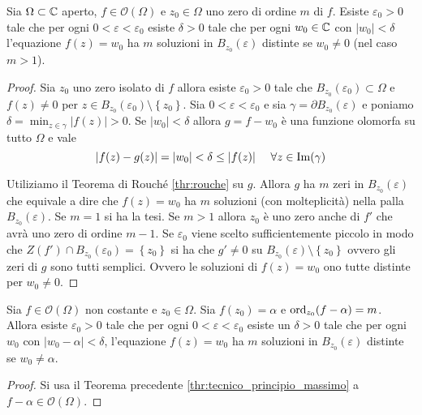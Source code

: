 \begin{theorem}
	\label{thr:tecnico_principio_massimo}
  Sia $\Omega \subset \mathbb{C}$ aperto, $f \in \mathcal{O}(\Omega)$ e $z_0 \in \Omega$
  uno zero di ordine $m$ di $f$. Esiste $\varepsilon_0 > 0$ tale che per ogni $0
  < \varepsilon < \varepsilon_0$ esiste $\delta > 0$ tale che per ogni $w_0 \in
  \mathbb{C}$ con $|w_0| < \delta$ l'equazione $f(z) = w_0$ ha $m$ soluzioni in
  $B_{z_0}(\varepsilon)$ distinte se $w_0 \neq 0$ (nel caso $m > 1$). 
\end{theorem}
\begin{proof}
    Sia $z_0$ uno zero isolato di $f$ allora esiste $\varepsilon_0 > 0$ tale che
    $B_{z_0}(\varepsilon_0) \subset \Omega$ e $f(z) \neq 0$ per $z \in
    B_{z_0}(\varepsilon_0) \setminus \left\{ z_0 \right\}$. Sia $0 < \varepsilon
    < \varepsilon_0$ e sia $\gamma = \partial B_{z_0}(\varepsilon)$ e poniamo 
    $\delta = \min_{z \in \gamma} |f(z)| > 0$. Se $|w_0| < \delta$ allora $g
    = f - w_0$ è una funzione olomorfa su tutto $\Omega$ e vale 
    \begin{equation*}
      |f(z) - g(z)| = |w_0| < \delta \le |f(z)| \quad\ \forall z \in
      \operatorname{Im}(\gamma)
    \end{equation*}
    
    Utiliziamo il Teorema di Rouché \ref{thr:rouche} su $g$. Allora $g$ ha $m$
    zeri in $B_{z_0}(\varepsilon)$ che equivale a dire che $f(z) = w_0$ ha $m$
    soluzioni (con molteplicità) nella palla $B_{z_0}(\varepsilon)$.
    Se $m = 1$ si ha la tesi.
    Se $m > 1$ allora $z_0$ è uno zero anche di $f'$ che avrà uno zero di ordine
    $m-1$. Se $\varepsilon_0$ viene scelto sufficientemente piccolo in modo che
    $Z(f') \cap B_{z_0}(\varepsilon_0) = \left\{ z_0 \right\}$ si ha che $g'
    \neq 0$ su $B_{z_0}(\varepsilon) \setminus \left\{ z_0 \right\}$ ovvero gli
    zeri di $g$ sono tutti semplici. Ovvero le soluzioni di $f(z) = w_0$ ono
    tutte distinte per $w_0 \neq 0$.
\end{proof}

\begin{corollary}
	\label{cor:tecnico_principio_massimo}
  Sia $f \in \mathcal{O}(\Omega)$ non costante e $z_0 \in \Omega$. Sia $f(z_0)
  = \alpha$ e $\operatorname{ord}_{z_0}(f-\alpha) = m$. Allora esiste $\varepsilon_0 > 0$ tale
  che per ogni $0 < \varepsilon < \varepsilon_0$ esiste un $\delta > 0$ tale che
  per ogni $w_0$ con $|w_0 - \alpha| < \delta$, l'equazione $f(z) = w_0$ ha $m$
  soluzioni in $B_{z_0}(\varepsilon)$ distinte se $w_0 \neq \alpha$.
\end{corollary}
\begin{proof}
  Si usa il Teorema precedente \ref{thr:tecnico_principio_massimo} a $f - \alpha
  \in \mathcal{O}(\Omega)$.
\end{proof}

